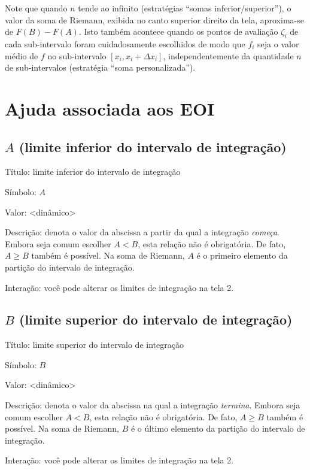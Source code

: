 \documentclass[a4paper,10pt]{scrartcl}
\begin{document}
    Note que quando $n$ tende ao infinito (estratégias ``somas inferior/superior''), o valor da soma de Riemann, exibida no canto superior direito da tela, aproxima-se de $F(B)-F(A)$. Isto também acontece quando os pontos de avaliação $\zeta_i$ de cada sub-intervalo foram cuidadosamente escolhidos de modo que $f_i$ seja o valor médio de $f$ no sub-intervalo $[x_i,x_i+\Delta x_i]$, independentemente da quantidade $n$ de sub-intervalos (estratégia ``soma personalizada'').

  \section*{Ajuda associada aos EOI}

  \subsection*{$A$ (limite inferior do intervalo de integração)}
    \begin{compactdesc}
      \item{Título:} limite inferior do intervalo de integração
      \item{Símbolo:} $A$
      \item{Valor:} <dinâmico>
      \item{Descrição:} denota o valor da abscissa a partir da qual a integração \emph{começa}. Embora seja comum escolher $A < B$, esta relação não é obrigatória. De fato, $A \ge B$ também é possível. Na soma de Riemann, $A$ é o primeiro elemento da partição do intervalo de integração.
      \item{Interação:} você pode alterar os limites de integração na tela 2.
    \end{compactdesc}

  \subsection*{$B$ (limite superior do intervalo de integração)}
    \begin{compactdesc}
      \item{Título:} limite superior do intervalo de integração
      \item{Símbolo:} $B$
      \item{Valor:} <dinâmico>
      \item{Descrição:} denota o valor da abscissa na qual a integração \emph{termina}. Embora seja comum escolher $A < B$, esta relação não é obrigatória. De fato, $A \ge B$ também é possível. Na soma de Riemann, $B$ é o último elemento da partição do intervalo de integração.
      \item{Interação:} você pode alterar os limites de integração na tela 2.
    \end{compactdesc}
\end{document}
